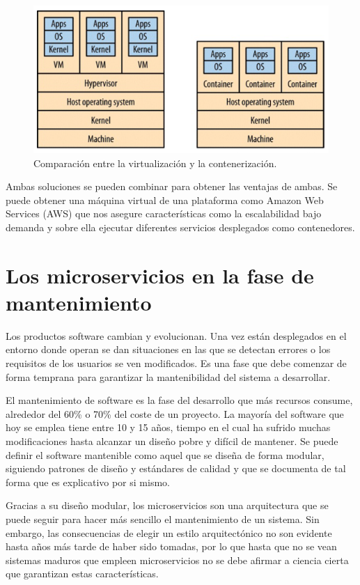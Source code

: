 \documentclass[11pt,spanish,listoffigures]{tfgetsinf}
\begin{document}
\begin{figure}[h]
\centering
\includegraphics[scale=0.8]{containers_vms}
\caption{Comparación entre la virtualización y la contenerización. \cite{Newman2015a}}
\end{figure}

Ambas soluciones se pueden combinar para obtener las ventajas de ambas. Se puede obtener una máquina virtual de una plataforma como Amazon Web Services (AWS) que nos asegure características como la escalabilidad bajo demanda y sobre ella ejecutar diferentes servicios desplegados como contenedores.

\section{Los microservicios en la fase de mantenimiento}

Los productos software cambian y evolucionan. Una vez están desplegados en el entorno donde operan se dan situaciones en las que se detectan errores o los requisitos de los usuarios se ven modificados. Es una fase que debe comenzar de forma temprana para garantizar la mantenibilidad del sistema a desarrollar. \cite{Bourque2014}

El mantenimiento de software es la fase del desarrollo que más recursos consume, alrededor del 60\% o 70\% del coste de un proyecto. La mayoría del software que hoy se emplea tiene entre 10 y 15 años, tiempo en el cual ha sufrido muchas modificaciones hasta alcanzar un diseño pobre y difícil de mantener. Se puede definir el software mantenible como aquel que se diseña de forma modular, siguiendo patrones de diseño y estándares de calidad y que se documenta de tal forma que es explicativo por si mismo. \cite{Pressman} 

Gracias a su diseño modular, los microservicios son una arquitectura que se puede seguir para hacer más sencillo el mantenimiento de un sistema. Sin embargo, las consecuencias de elegir un estilo arquitectónico no son evidente hasta años más tarde de haber sido tomadas, por lo que hasta que no se vean sistemas maduros que empleen microservicios no se debe afirmar a ciencia cierta que garantizan estas características. \cite{Lewis2014}
\end{document}
